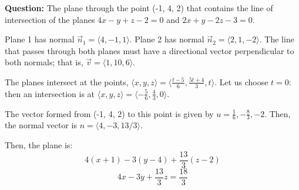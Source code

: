 \documentclass{article}
\begin{document}
\textbf{Question:} The plane through the point (-1, 4, 2) that contains the line of intersection of the planes $4x - y + z - 2 = 0$ and $2x + y - 2z - 3 = 0$. \bigskip

Plane 1 has normal $\vec{n}_1 = \langle 4, -1, 1 \rangle$. Plane 2 has normal $\vec{n}_2 = \langle 2, 1, -2 \rangle$. The line that passes through both planes must have a directional vector perpendicular to both normals; that is, $\vec{v} = \langle 1, 10, 6 \rangle$. \bigskip

The planes intersect at the points, $\langle x, y, z \rangle = \langle \frac{t - 5}{6}, \frac{5t + 4}{3}, t \rangle$. Let us choose $t = 0$: then an intersection is at $\langle x, y, z \rangle = \langle -\frac{5}{6}, \frac{4}{3}, 0 \rangle$. \bigskip

The vector formed from (-1, 4, 2) to this point is given by $u = \frac{1}{6}, -\frac{8}{3}, -2$. Then, the normal vector is $n = \langle 4, -3, 13/3 \rangle$. \bigskip

Then, the plane is: 
\[ 4(x + 1) - 3(y - 4) + \frac{13}{3}(z - 2) \]
\[ 4x - 3y + \frac{13}{3}z = \frac{18}{3} \]
\end{document}
